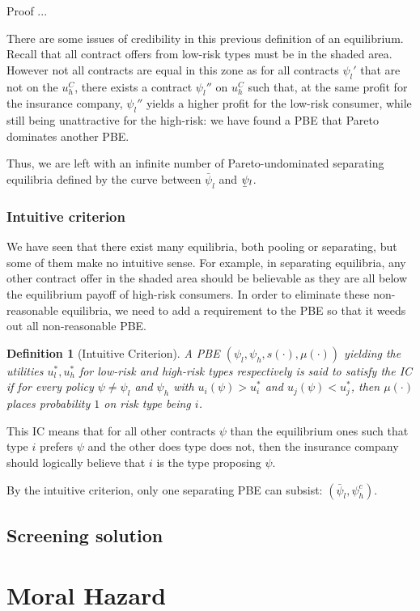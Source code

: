 \documentclass[12pt]{report}
\newtheorem{definition}{Definition}[chapter]
\newcommand{\ubar}[1]{\underaccent{\bar}{#1}}
\begin{document}
Proof ...

There are some issues of credibility in this previous definition of an equilibrium. Recall that all contract offers from low-risk types must be in the shaded area. However not all contracts are equal in this zone as for all contracts $\psi_l'$ that are not on the $u_h^C$, there exists a contract $\psi_l''$ on $u_h^C$ such that, at the same profit for the insurance company, $\psi_l''$ yields a higher profit for the low-risk consumer, while still being unattractive for the high-risk: we have found a PBE that Pareto dominates another PBE.

Thus, we are left with an infinite number of Pareto-undominated separating equilibria defined by the curve between $\bar\psi_l$ and $\ubar\psi_l$. 

\subsubsection{Intuitive criterion}

We have seen that there exist many equilibria, both pooling or separating, but some of them make no intuitive sense. For example, in separating equilibria, any other contract offer in the shaded area should be believable as they are all below the equilibrium payoff of high-risk consumers. In order to eliminate these non-reasonable equilibria, we need to add a requirement to the PBE so that it weeds out all non-reasonable PBE.

\begin{definition}[Intuitive Criterion]
A PBE $(\psi_l, \psi_h, s(\cdot), \mu(\cdot))$ yielding the utilities $u_l^*, u_h^*$ for low-risk and high-risk types respectively is said to satisfy the IC if for every policy $\psi \neq \psi_l$ and $\psi_h$ with $u_i(\psi) > u_i^*$ and $u_j(\psi) < u_j^*$, then $\mu(\cdot)$ places probability $1$ on risk type being $i$.
\end{definition} This IC means that for all other contracts $\psi$ than the equilibrium ones such that type $i$ prefers $\psi$ and the other does type does not, then the insurance company should logically believe that $i$ is the type proposing $\psi$.

By the intuitive criterion, only one separating PBE can subsist: $(\bar\psi_l,\psi_h^c)$.

\subsection{Screening solution}



\section{Moral Hazard}
\end{document}
